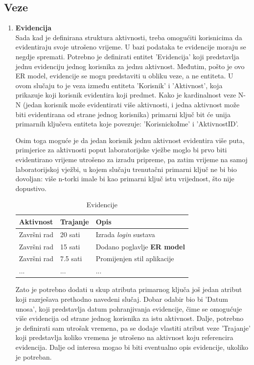 \documentclass[times, utf8, zavrsni, numeric]{fer}
\begin{document}
\subsection{Veze}
\begin{enumerate}[leftmargin=*]
\item \textbf{Evidencija}\\
Sada kad je definirana struktura aktivnosti, treba omogućiti korisnicima da evidentiraju svoje utrošeno vrijeme. U bazi podataka te evidencije moraju se negdje spremati. Potrebno je definirati entitet 'Evidencija' koji predstavlja jednu evidenciju jednog korisnika za jednu aktivnost. Međutim, pošto je ovo ER model, evidencije se mogu predstaviti u obliku veze, a ne entiteta. U ovom slučaju to je veza između entiteta 'Korisnik' i 'Aktivnost', koja prikazuje koji korisnik evidentira koji predmet. Kako je kardinalnost veze N-N (jedan korisnik može evidentirati više aktivnosti, i jedna aktivnost može biti evidentirana od strane jednog korisnika) primarni ključ bit će unija primarnih ključeva entiteta koje povezuje: 'KorisnickoIme' i 'AktivnostID'.

Osim toga moguće je da jedan korisnik jednu aktivnost evidentira više puta, primjerice za aktivnosti poput laboratorijske vježbe moglo bi prvo biti evidentirano vrijeme utrošeno za izradu pripreme, pa zatim vrijeme na samoj laboratorijskoj vježbi, u kojem slučaju trenutačni primarni ključ ne bi bio dovoljan: više n-torki imale bi kao primarni ključ istu vrijednost, što nije dopustivo. 

\begin{table}[H]
\caption{Evidencije}
\label{tbl:talica-evidencija}
\centering
\begin{tabular}{lll} \hline
Aktivnost & Trajanje & Opis\\ \hline
Završni rad & 20 sati & Izrada \emph{login} sustava\\ 
Završni rad & 15 sati & Dodano poglavlje \textbf{ER model}\\
Završni rad & 7.5 sati & Promijenjen stil aplikacije\\
... & ... & ...\\
\end{tabular}
\end{table}

Zato je potrebno dodati u skup atributa primarnog ključa još jedan atribut koji razrješava prethodno navedeni slučaj. Dobar odabir bio bi 'Datum unosa', koji predstavlja datum pohranjivanja evidencije, čime se omogućuje više evidencija od strane jednog korisnika za istu aktivnost. Dalje, potrebno je definirati sam utrošak vremena, pa se dodaje vlastiti atribut veze 'Trajanje' koji predstavlja koliko vremena je utrošeno na aktivnost koju referencira evidencija. Dalje od interesa mogao bi biti eventualno opis evidencije, ukoliko je potreban. 


\end{enumerate}
\end{document}
